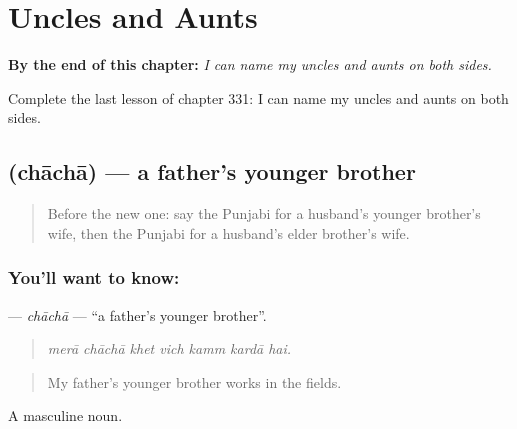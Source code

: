 
\chapter{Uncles and Aunts}
\label{ch:pa-a2-uncles-and-aunts}

\begin{chapteropening}
\textbf{By the end of this chapter:} \emph{I can name my uncles and aunts on both sides.}

Complete the last lesson of chapter 331: I can name my uncles and aunts on both sides.
\end{chapteropening}

\section[\texorpdfstring{\pa{ਚਾਚਾ} (chāchā)}{ਚਾਚਾ (chāchā)}]{ (chāchā) — a father's younger brother}

\label{lesson:PA-C331-chacha}



\begin{quote}
Before the new one: say the Punjabi for a husband's younger brother's wife, then the Punjabi for a husband's elder brother's wife.
\end{quote}

\subsection*{You'll want to know: }
\textbf{} — \emph{chāchā} — \textquotedblleft{}a father's younger brother\textquotedblright{}.

\begin{quote}
      
\end{quote}

\begin{quote}
\emph{merā chāchā khet vich kamm kardā hai.}
\end{quote}

\begin{quote}
My father's younger brother works in the fields.
\end{quote}

A masculine noun.

